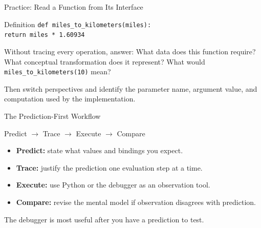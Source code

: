 \documentclass[aspectratio=169,10pt]{beamer}
\begin{document}
\begin{frame}{Practice: Read a Function from Its Interface}
  \begin{block}{Definition}
    \texttt{def miles\_to\_kilometers(miles):}\\
    \hspace*{1em}\texttt{return miles * 1.60934}
  \end{block}

  \begin{activity}
    Without tracing every operation, answer: What data does this function require? What conceptual transformation does it represent? What would \texttt{miles\_to\_kilometers(10)} mean?
  \end{activity}

  \begin{exampleblockcp}
    Then switch perspectives and identify the parameter name, argument value, and computation used by the implementation.
  \end{exampleblockcp}
\end{frame}


\begin{frame}{The Prediction-First Workflow}
  \begin{center}
    \Large
    Predict
    $\longrightarrow$
    Trace
    $\longrightarrow$
    Execute
    $\longrightarrow$
    Compare
  \end{center}

  \vspace{0.18in}

  \begin{itemize}
    \item \textbf{Predict:} state what values and bindings you expect.
    \item \textbf{Trace:} justify the prediction one evaluation step at a time.
    \item \textbf{Execute:} use Python or the debugger as an observation tool.
    \item \textbf{Compare:} revise the mental model if observation disagrees with prediction.
  \end{itemize}

  \begin{keyidea}
    The debugger is most useful after you have a prediction to test.
  \end{keyidea}
\end{frame}
\end{document}
